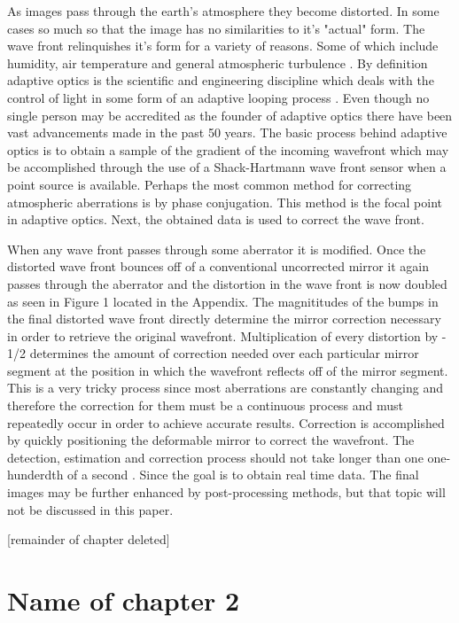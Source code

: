 \documentclass[MS, xcolor=dvipsnames]{wfuthesis} %
\begin{document}
As images pass through the earth's atmosphere they become distorted.  In some cases so much so that the image has no similarities to it's "actual" form.  The wave front relinquishes it's form for a variety of reasons.  Some of which include humidity, air temperature and general atmospheric turbulence \cite{Tyson}.  By definition adaptive optics is the scientific and engineering discipline which deals with the control of light in some form of an adaptive looping process \cite{Tyson}.  Even though no single person may be accredited as the founder of adaptive optics there have been vast advancements made in the past 50 years.  The basic process behind adaptive optics is to obtain a sample of the gradient of the incoming wavefront which may be accomplished through the use of a Shack-Hartmann wave front sensor when a point source is available.  Perhaps the most common method for correcting atmospheric aberrations is by phase conjugation.  This method is the focal point in adaptive optics.  Next, the obtained data is used to correct the wave front.

When any wave front passes through some aberrator it is modified.  Once the distorted wave front bounces off of a conventional uncorrected mirror it again passes through the aberrator and the distortion in the wave front is now doubled as seen in Figure 1 located in the Appendix.  The magnititudes of the bumps in the final distorted wave front directly determine the mirror correction necessary in order to retrieve the original wavefront.  Multiplication of every distortion by - 1/2 determines the amount of correction needed over each particular mirror segment at the position in which the wavefront reflects off of the mirror segment.  This is a very tricky process since most aberrations are constantly changing and therefore the correction for them must be a continuous process and must repeatedly occur in order to achieve accurate results.  Correction is accomplished by quickly positioning the deformable mirror to correct the wavefront.  The detection, estimation and correction process should not take longer than one one-hunderdth of a second \cite{Tyson}.  Since the goal is to obtain real time data.  The final images may be further enhanced by post-processing methods, but that topic will not be discussed in this paper.

[remainder of chapter deleted]

\chapter{Name of chapter 2}
\end{document}
